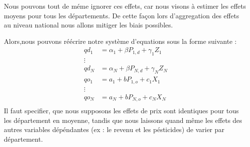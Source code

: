 \documentclass[11pt, a4paper]{article}
\begin{document}
\par
Nous pouvons tout de méme ignorer ces effets, car nous visons à estimer les effets moyens pour tous les départements. 
De cette façon lors d'aggregation des effets au niveau national nous allons mitiger les biais possibles.
\par
Alors,nous pouvons réécrire notre système d'equations sous la forme suivante :
\begin{align*}
  qd_1 & = \alpha_{1} + \beta P_{1,d} + \gamma_{1} Z_{1} \\
  \vdots \\ 
  qd_N & = \alpha_{N} + \beta P_{N,d} + \gamma_{N} Z_{N} \\
  qo_1 & = a_1 + b P_{1,o} + c_1 X_{1} \\ 
  \vdots \\ 
  qo_N & = a_N + b P_{N,o} + c_N X_{N} \\
\end{align*}
Il faut specifier, que nous supposons les effets de prix sont identiques pour tous les département en moyenne, tandis que nous laissons quand même les effets des autres variables dépéndantes (ex : le revenu et les pésticides) de varier par département.
\end{document}
